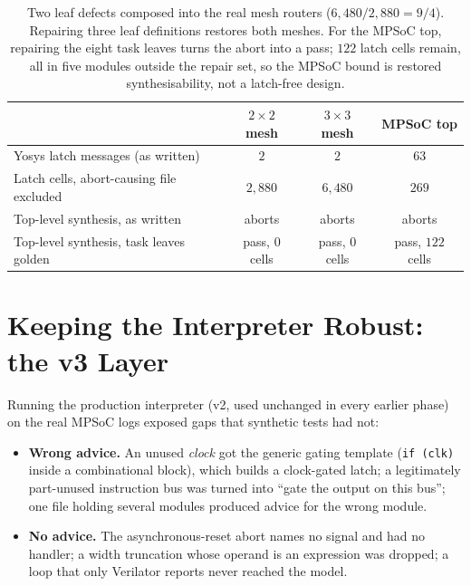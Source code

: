 \documentclass[11pt]{article}
\begin{document}
\begin{table}[htbp]
\centering
\caption{Two leaf defects composed into the real mesh routers
($6{,}480/2{,}880 = 9/4$). Repairing three leaf definitions restores both
meshes. For the MPSoC top, repairing the eight task leaves turns the abort into
a pass; $122$ latch cells remain, all in five modules outside the repair set,
so the MPSoC bound is restored synthesisability, not a latch-free design.}
\label{tab:prop}
\small
\begin{tabularx}{\linewidth}{@{} X c c c @{}}
\toprule
 & \textbf{$2{\times}2$ mesh} & \textbf{$3{\times}3$ mesh} & \textbf{MPSoC top} \\
\midrule
Yosys latch messages (as written)      & $2$ & $2$ & $63$ \\
Latch cells, abort-causing file excluded & $2{,}880$ & $6{,}480$ & $269$ \\
Top-level synthesis, as written          & aborts & aborts & aborts \\
Top-level synthesis, task leaves golden  & pass, $0$ cells & pass, $0$ cells & pass, $122$ cells \\
\bottomrule
\end{tabularx}
\end{table}

\section{Keeping the Interpreter Robust: the v3 Layer}
\label{sec:v3}

Running the production interpreter (v2, used unchanged in every earlier phase)
on the real MPSoC logs exposed gaps that synthetic tests had not:
\begin{itemize}[leftmargin=1.2em, itemsep=0.1em]
\item \textbf{Wrong advice.} An unused \emph{clock} got the generic gating
template (\texttt{if (clk)} inside a combinational block), which builds a
clock-gated latch; a legitimately part-unused instruction bus was turned into
``gate the output on this bus''; one file holding several modules produced
advice for the wrong module.
\item \textbf{No advice.} The asynchronous-reset abort names no signal and had
no handler; a width truncation whose operand is an expression was dropped; a
loop that only Verilator reports never reached the model.
\end{itemize}
\end{document}
